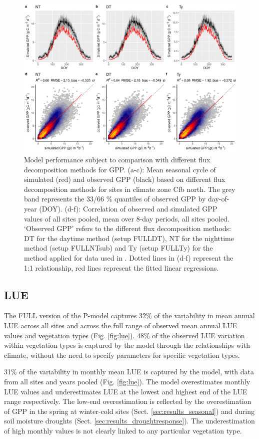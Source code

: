 \documentclass[gmd, manuscript]{copernicus}
\begin{document}
 \begin{figure}[t]
\includegraphics[width=12cm]{fig/meandoy_modobs_gpp_data.pdf}
    \caption{Model performance subject to comparison with different flux decomposition methods for GPP. (a-c): Mean seasonal cycle of simulated (red) and observed GPP (black) based on different flux decomposition methods for sites in climate zone Cfb north. The grey band represents the 33/66 \% quantiles of observed GPP by day-of-year (DOY). (d-f): Correlation of observed and simulated GPP values of all sites pooled, mean over 8-day periods, all sites pooled. `Observed GPP' refers to the different flux decomposition methods: DT for the daytime method (setup FULL\textunderscore DT), NT for the nighttime method (setup FULL\textunderscore NTsub) and Ty (setup FULL\textunderscore Ty) for the method applied for data used in \citet{wang17rs}. Dotted lines in (d-f) represent the 1:1 relationship, red lines represent the fitted linear regressions.}
    \label{fig:modobs_10d_gppdata}
\end{figure}


\subsection{LUE}
\label{sec:results_lue}
The FULL version of the P-model captures 32\% of the variability in mean annual LUE across all sites and across the full range of observed mean annual LUE values and vegetation types (Fig. \ref{fig:lue}). 48\% of the observed LUE variation within vegetation types is captured by the model through the relationships with climate, without the need to specify parameters for specific vegetation types. 

31\% of the variability in monthly mean LUE is captured by the model, with data from all sites and years pooled (Fig. \ref{fig:lue}). The model overestimates monthly LUE values and underestimates LUE at the lowest and highest end of the LUE range respectively. The low-end overestimation is reflected by the overestimation of GPP in the spring at winter-cold sites (Sect. \ref{sec:results_seasonal}) and during soil moisture droughts (Sect. \ref{sec:results_droughtresponse}). The underestimation of high monthly values is not clearly linked to any particular vegetation type.
\end{document}
